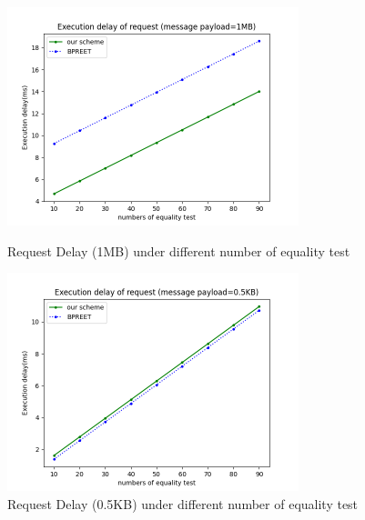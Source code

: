 \documentclass[journal]{IEEEtran}
\begin{document}
\begin{figure}
    \centering
    \includegraphics[width=240pt]{picture/Figure_1.png}
    \caption{Request Delay (1MB) under different number of equality test}
    \label{fig:et_1mb}
    
    \centering
    \includegraphics[width=240pt]{picture/Figure_2.png}
    \caption{Request Delay (0.5KB) under different number of equality test}
    \label{fig:et_0.5kb}
\end{figure}
\end{document}

